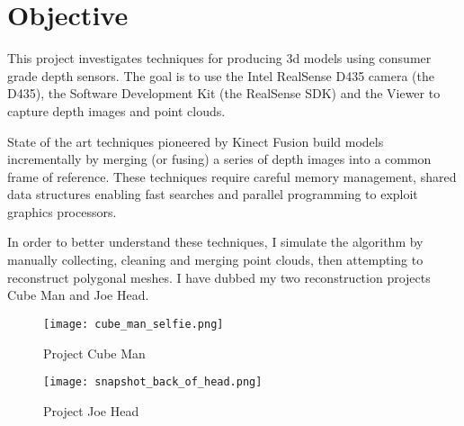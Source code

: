 \section{Objective}

This project investigates techniques for producing 3d models using consumer
grade depth sensors. The goal is to use the Intel RealSense D435 camera (the D435),
the Software Development Kit (the RealSense SDK) and the Viewer to capture
depth images and point clouds.

State of the art techniques pioneered by Kinect Fusion \cite{newcombe2011kinectfusion}
 build models incrementally by merging (or fusing) a series of depth images into
 a common frame of reference. These techniques require careful memory management,
 shared data structures enabling fast searches and parallel programming to exploit
 graphics processors.

In order to better understand these techniques, I simulate the algorithm by
manually collecting, cleaning and merging point clouds, then attempting
to reconstruct polygonal meshes. I have dubbed my two reconstruction projects
Cube Man and Joe Head.

\begin{figure}[h]
 \centering
 \texttt{[image: cube\_man\_selfie.png]}
\caption{Project Cube Man}
\end{figure}

\begin{figure}[h]
\centering
 \texttt{[image: snapshot\_back\_of\_head.png]}
  \caption{Project Joe Head}
 \end{figure}

